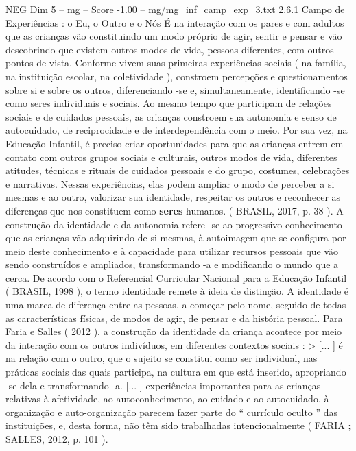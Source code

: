 \begin{textsample}{NEG Dim 5 – mg – Score -1.00 – mg/mg\_inf\_camp\_exp\_3.txt}  \label{ex:f5_neg_108}
2.6.1 Campo de Experiências : o Eu, o Outro e o Nós É na interação com os pares e com adultos que as crianças vão constituindo um modo próprio de agir, sentir e pensar e vão descobrindo que existem outros modos de vida, pessoas diferentes, com outros pontos de vista.
Conforme vivem suas primeiras experiências sociais ( na família, na instituição escolar, na coletividade ), constroem percepções e questionamentos sobre si e sobre os outros, diferenciando -se e, simultaneamente, identificando -se como seres individuais e sociais.
Ao mesmo tempo que participam de relações sociais e de cuidados pessoais, as crianças constroem sua autonomia e senso de autocuidado, de reciprocidade e de interdependência com o meio.
Por sua vez, na Educação Infantil, é preciso criar oportunidades para que as crianças entrem em contato com outros grupos sociais e culturais, outros modos de vida, diferentes atitudes, técnicas e rituais de cuidados pessoais e do grupo, costumes, celebrações e narrativas.
Nessas experiências, elas podem ampliar o modo de perceber a si mesmas e ao outro, valorizar sua identidade, respeitar os outros e reconhecer as diferenças que nos constituem como \textbf{seres} humanos. ( BRASIL, 2017, p. 38 ).
A construção da identidade e da autonomia refere -se ao progressivo conhecimento que as crianças vão adquirindo de si mesmas, à autoimagem que se configura por meio deste conhecimento e à capacidade para utilizar recursos pessoais que vão sendo construídos e ampliados, transformando -a e modificando o mundo que a cerca.
De acordo com o Referencial Curricular Nacional para a Educação Infantil ( BRASIL, 1998 ), o termo identidade remete à ideia de distinção.
A identidade é uma marca de diferença entre as pessoas, a começar pelo nome, seguido de todas as características físicas, de modos de agir, de pensar e da história pessoal.
Para Faria e Salles ( 2012 ), a construção da identidade da criança acontece por meio da interação com os outros indivíduos, em diferentes contextos sociais : > [... ] é na relação com o outro, que o sujeito se constitui como ser individual, nas práticas sociais das quais participa, na cultura em que está inserido, apropriando -se dela e transformando -a. [... ] experiências importantes para as crianças relativas à afetividade, ao autoconhecimento, ao cuidado e ao autocuidado, à organização e auto-organização parecem fazer parte do “ currículo oculto ” das instituições, e, desta forma, não têm sido trabalhadas intencionalmente ( FARIA ; SALLES, 2012, p. 101 ).

\end{textsample}
